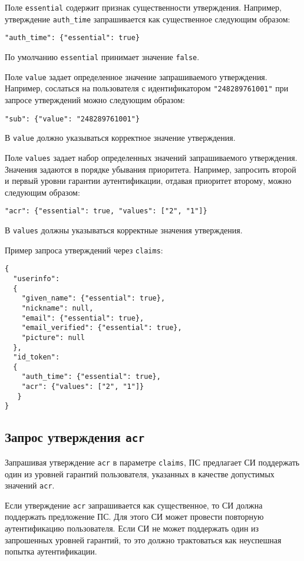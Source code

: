 Поле \lstinline{essential} содержит признак существенности утверждения. 
Например, утверждение \lstinline{auth_time} запрашивается как 
существенное следующим образом: 
\begin{lstlisting}
"auth_time": {"essential": true}
\end{lstlisting}

По умолчанию \lstinline{essential} принимает значение \lstinline{false}.

Поле \lstinline{value} задает определенное значение запрашиваемого 
утверждения. Например, сослаться на пользователя с идентификатором 
\lstinline{"248289761001"} при запросе утверждений можно следующим образом:
\begin{lstlisting}
"sub": {"value": "248289761001"}
\end{lstlisting}

В \lstinline{value} должно указываться корректное значение утверждения. 

Поле \lstinline{values} задает набор определенных значений запрашиваемого 
утверждения. Значения задаются в порядке убывания приоритета.
%
Например, запросить второй и первый уровни гарантии аутентификации,
отдавая приоритет второму, можно следующим образом:
\begin{lstlisting}
"acr": {"essential": true, "values": ["2", "1"]}
\end{lstlisting}

В \lstinline{values} должны указываться корректные значения утверждения.

Пример запроса утверждений через \lstinline{claims}:
\begin{lstlisting}
{
  "userinfo":
  {
    "given_name": {"essential": true},
    "nickname": null,
    "email": {"essential": true},
    "email_verified": {"essential": true},
    "picture": null
  },
  "id_token":
  {
    "auth_time": {"essential": true},
    "acr": {"values": ["2", "1"]}
   }
}
\end{lstlisting}

\subsection{Запрос утверждения \lstinline{acr}}\label{CLAIMS.ReqAcr}

Запрашивая утверждение \lstinline{acr} в параметре \lstinline{claims}, ПС 
предлагает СИ поддержать один из уровней гарантий пользователя, указанных в 
качестве допустимых значений \lstinline{acr}. 

Если утверждение \lstinline{acr} запрашивается как существенное,
то СИ должна поддержать предложение ПС. 
%
Для этого СИ может провести повторную аутентификацию пользователя. 
%
Если СИ не может поддержать один из запрошенных уровней гарантий, 
то это должно трактоваться как неуспешная попытка аутентификации.

